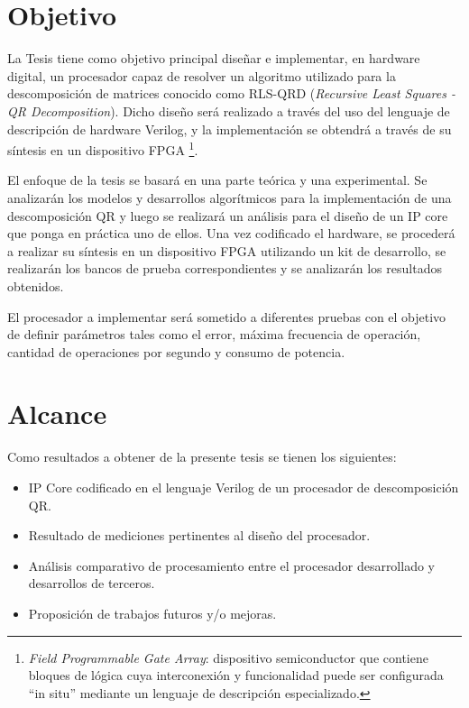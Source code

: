 \section{Objetivo}

La Tesis tiene como objetivo principal diseñar e implementar, en hardware digital, un procesador capaz de resolver un algoritmo utilizado para la descomposición de matrices conocido como RLS-QRD (\textit{Recursive Least Squares - QR Decomposition}). Dicho diseño será realizado a través del uso del lenguaje de descripción de hardware Verilog, y la implementación se obtendrá a través de su síntesis en un dispositivo FPGA \footnote{\label{FPGA}\textit{Field Programmable Gate Array}: dispositivo semiconductor que contiene bloques de lógica cuya interconexión y funcionalidad puede ser configurada ``in situ'' mediante un lenguaje de descripción especializado.}.

El enfoque de la tesis se basará en una parte teórica y una experimental. Se analizarán los modelos y desarrollos algorítmicos para la implementación de una descomposición QR y luego se realizará un análisis para el diseño de un IP core que ponga en práctica uno de ellos. Una vez codificado el hardware, se procederá a realizar su síntesis en un dispositivo FPGA utilizando un kit de desarrollo, se realizarán los bancos de prueba correspondientes y se analizarán los resultados
obtenidos.

El procesador a implementar será sometido a diferentes pruebas con el objetivo de definir parámetros tales como el error, máxima frecuencia de operación, cantidad de operaciones por segundo y consumo de potencia.

\section{Alcance}

Como resultados a obtener de la presente tesis se tienen los siguientes:

\begin{itemize}
    \item IP Core codificado en el lenguaje Verilog de un procesador de descomposición QR.
    \item Resultado de mediciones pertinentes al diseño del procesador.
    \item Análisis comparativo de procesamiento entre el procesador desarrollado y desarrollos de terceros.
    \item Proposición de trabajos futuros y/o mejoras.
\end{itemize}

